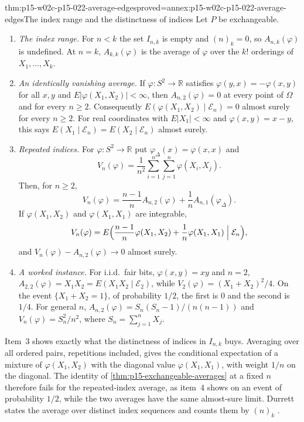 \begin{hbtheorem}{thm:p15-w02c-p15-022-average-edges}{proved=annex:p15-w02c-p15-022-average-edges}{The index range and the distinctness of indices}
Let \(P\) be exchangeable.
\begin{enumerate}
\item \emph{The index range.} For \(n<k\) the set \(I_{n,k}\) is empty
      and \((n)_k=0\), so \(A_{n,k}(\varphi)\) is undefined. At \(n=k\),
      \(A_{k,k}(\varphi)\) is the average of \(\varphi\) over the \(k!\)
      orderings of \(X_1,\ldots,X_k\).
\item \emph{An identically vanishing average.} If
      \(\varphi:S^2\to\mathbb R\) satisfies
      \(\varphi(y,x)=-\varphi(x,y)\) for all \(x,y\) and
      \(E|\varphi(X_1,X_2)|<\infty\), then \(A_{n,2}(\varphi)=0\) at every
      point of \(\Omega\) and for every \(n\geq2\). Consequently
      \(E(\varphi(X_1,X_2)\mid\mathcal E_n)=0\) almost surely for every
      \(n\geq2\). For real coordinates with \(E|X_1|<\infty\) and
      \(\varphi(x,y)=x-y\), this says
      \(E(X_1\mid\mathcal E_n)=E(X_2\mid\mathcal E_n)\) almost surely.
\item \emph{Repeated indices.} For \(\varphi:S^2\to\mathbb R\) put
      \(\varphi_\Delta(x)=\varphi(x,x)\) and
      \[
       V_n(\varphi)=\frac1{n^2}\sum_{i=1}^n\sum_{j=1}^n\varphi(X_i,X_j).
      \]
      Then, for \(n\geq2\),
      \[
       V_n(\varphi)=\frac{n-1}nA_{n,2}(\varphi)+\frac1nA_{n,1}(\varphi_\Delta).
      \]
      If \(\varphi(X_1,X_2)\) and \(\varphi(X_1,X_1)\) are integrable,
      \[
       V_n(\varphi)=E\Bigl(\frac{n-1}n\varphi(X_1,X_2)
                     +\frac1n\varphi(X_1,X_1)\Bigm|\mathcal E_n\Bigr),
      \]
      and \(V_n(\varphi)-A_{n,2}(\varphi)\to0\) almost surely.
\item \emph{A worked instance.} For i.i.d.\ fair bits,
      \(\varphi(x,y)=xy\) and \(n=2\),
      \(A_{2,2}(\varphi)=X_1X_2=E(X_1X_2\mid\mathcal E_2)\), while
      \(V_2(\varphi)=(X_1+X_2)^2/4\). On the event \(\{X_1+X_2=1\}\),
      of probability \(1/2\), the first is \(0\) and the second is
      \(1/4\). For general \(n\),
      \(A_{n,2}(\varphi)=S_n(S_n-1)/(n(n-1))\) and
      \(V_n(\varphi)=S_n^2/n^2\), where \(S_n=\sum_{j=1}^nX_j\).
\end{enumerate}
\end{hbtheorem}

Item~3 shows exactly what the distinctness of indices in
\(I_{n,k}\) buys. Averaging over all ordered pairs, repetitions
included, gives the conditional expectation of a mixture of
\(\varphi(X_1,X_2)\) with the diagonal value \(\varphi(X_1,X_1)\), with
weight \(1/n\) on the diagonal. The identity of
\cref{thm:p15-exchangeable-averages} at a fixed \(n\) therefore fails for
the repeated-index average, as item~4 shows on an event of probability
\(1/2\), while the two averages have the same almost-sure limit. Durrett
states the average over distinct index sequences and counts them by
\((n)_k\) \cite[p.~252]{DurrettPTEAuthor2019}.

